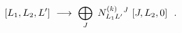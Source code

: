\begin{equation}\label{mmAflowI}
[L_{1},L_{2},L']\ \longrightarrow \ \makebox[6cm][l]{$\displaystyle\bigoplus_{J}\
N^{(k)}_{L_{1}L'}{}^{J}\ [J,L_{2},0] \ \ .$}
\end{equation}

